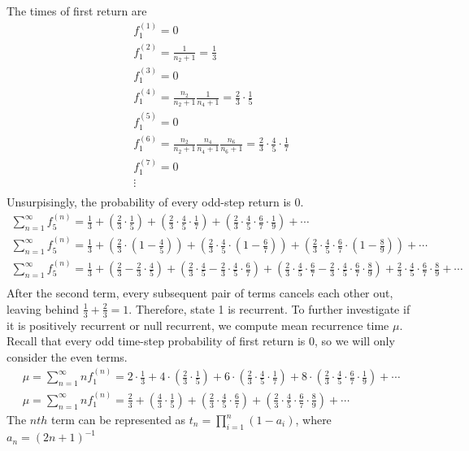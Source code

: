 The times of first return are
\begin{gather*}
f_1^{(1)} = 0 \\
f_1^{(2)} = \frac{1}{n_2+1} = \frac{1}{3} \\
f_1^{(3)} = 0 \\
f_1^{(4)} = \frac{n_2}{n_2+1}  \frac{1}{n_4+1} = \frac{2}{3}\cdot\frac{1}{5}  \\
f_1^{(5)} = 0\\
f_1^{(6)} = \frac{n_2}{n_2+1}  \frac{n_4}{n_4+1}  \frac{n_6}{n_6+1} = \frac{2}{3}\cdot\frac{4}{5}\cdot\frac{1}{7}  \\
f_1^{(7)} = 0 \\
\vdots\\
\end{gather*}
Unsurpisingly, the probability of every odd-step return is 0.
\begin{gather*}
\sum_{n=1}^{\infty}f_{5}^{(n)} = \frac{1}{3} + (\frac{2}{3}\cdot\frac{1}{5}) + (\frac{2}{3}\cdot\frac{4}{5}\cdot\frac{1}{7}) + (\frac{2}{3}\cdot\frac{4}{5}\cdot\frac{6}{7}\cdot\frac{1}{9}) + \cdots\\
\sum_{n=1}^{\infty}f_{5}^{(n)} = \frac{1}{3} + (\frac{2}{3}\cdot(1-\frac{4}{5})) + (\frac{2}{3}\cdot\frac{4}{5}\cdot(1-\frac{6}{7})) + (\frac{2}{3}\cdot\frac{4}{5}\cdot\frac{6}{7}\cdot(1-\frac{8}{9})) + \cdots\\
\sum_{n=1}^{\infty}f_{5}^{(n)} = \frac{1}{3} + (\frac{2}{3} - \frac{2}{3}\cdot\frac{4}{5}) + (\frac{2}{3}\cdot\frac{4}{5} - \frac{2}{3}\cdot\frac{4}{5}\cdot\frac{6}{7}) + (\frac{2}{3}\cdot\frac{4}{5}\cdot\frac{6}{7} - \frac{2}{3}\cdot\frac{4}{5}\cdot\frac{6}{7}\cdot\frac{8}{9}) + \frac{2}{3}\cdot\frac{4}{5}\cdot\frac{6}{7}\cdot\frac{8}{9} + \cdots\\
\end{gather*}
After the second term, every subsequent pair of terms cancels each other out, leaving behind $\frac{1}{3} + \frac{2}{3} = 1$. Therefore, state 1 is recurrent. To further investigate if it is positively recurrent or null recurrent, we compute mean recurrence time $\mu$. Recall that every odd time-step probability of first return is 0, so we will only consider the even terms.
\begin{gather*}
\mu=\sum_{n=1}^{\infty}nf_{1}^{(n)} =  2\cdot\frac{1}{3} + 4\cdot(\frac{2}{3}\cdot\frac{1}{5}) + 6\cdot(\frac{2}{3}\cdot\frac{4}{5}\cdot\frac{1}{7}) + 8\cdot(\frac{2}{3}\cdot\frac{4}{5}\cdot\frac{6}{7}\cdot\frac{1}{9}) + \cdots\\
\mu=\sum_{n=1}^{\infty}nf_{1}^{(n)} =  \frac{2}{3} + (\frac{4}{3}\cdot\frac{1}{5}) + (\frac{2}{3}\cdot\frac{4}{5}\cdot\frac{6}{7}) + (\frac{2}{3}\cdot\frac{4}{5}\cdot\frac{6}{7}\cdot\frac{8}{9}) + \cdots
\end{gather*}
The $nth$ term can be represented as $t_n = \prod_{i=1}^{n}(1-a_i)$, where $a_n = (2n+1)^{-1}$

